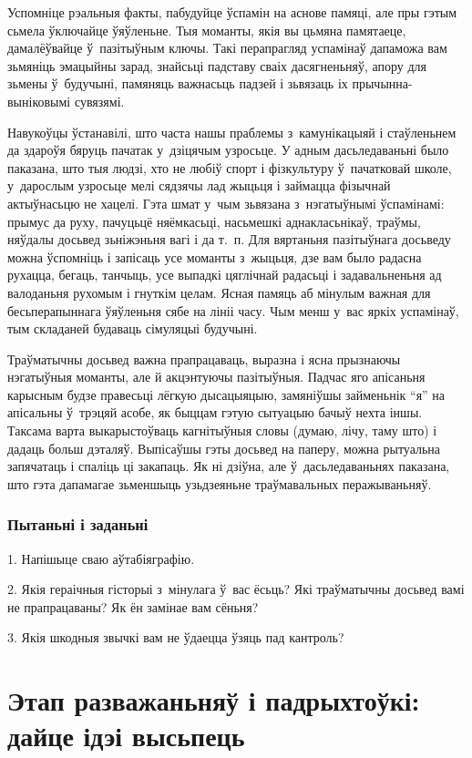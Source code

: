 Успомніце рэальныя факты, пабудуйце ўспамін на аснове памяці, але пры гэтым сьмела ўключайце ўяўленьне. Тыя моманты, якія вы цьмяна памятаеце, дамалёўвайце ў~пазітыўным ключы. Такі перапрагляд успамінаў дапаможа вам зьмяніць эмацыйны зарад, знайсьці падставу сваіх дасягненьняў, апору для зьмены ў~будучыні, памяняць важнасьць падзей і зьвязаць іх прычынна-выніковымі сувязямі.

Навукоўцы ўстанавілі, што часта нашы праблемы з~камунікацыяй і стаўленьнем да здароўя бяруць пачатак у~дзіцячым узросьце. У адным дасьледаваньні было паказана, што тыя людзі, хто не любіў спорт і фізкультуру ў~пачатковай школе, у~дарослым узросьце мелі сядзячы лад жыцьця і займацца фізычнай актыўнасьцю не хацелі. Гэта шмат у~чым зьвязана з~нэгатыўнымі ўспамінамі: прымус да руху, пачуцьцё няёмкасьці, насьмешкі аднакласьнікаў, траўмы, няўдалы досьвед зьніжэньня вагі і да т.~п. Для вяртаньня пазітыўнага досьведу можна ўспомніць і запісаць усе моманты з~жыцьця, дзе вам было радасна рухацца, бегаць, танчыць, усе выпадкі цяглічнай радасьці і задавальненьня ад валоданьня рухомым і гнуткім целам. Ясная памяць аб мінулым важная для бесьперапыннага ўяўленьня сябе на лініі часу. Чым менш у~вас яркіх успамінаў, тым складаней будаваць сімуляцыі будучыні.

Траўматычны досьвед важна прапрацаваць, выразна і ясна прызнаючы нэгатыўныя моманты, але й акцэнтуючы пазітыўныя. Падчас яго апісаньня карысным будзе правесьці лёгкую дысацыяцыю, замяніўшы займеньнік ``я'' на апісальны ў~трэцяй асобе, як быццам гэтую сытуацыю бачыў нехта іншы. Таксама варта выкарыстоўваць кагнітыўныя словы (думаю, лічу, таму што) і дадаць больш дэталяў. Выпісаўшы гэты досьвед на паперу, можна рытуальна запячатаць і спаліць ці закапаць. Як ні дзіўна, але ў~дасьледаваньнях паказана, што гэта дапамагае зьменшыць узьдзеяньне траўмавальных перажываньняў.

\subsubsection{Пытаньні і заданьні}

1. Напішыце сваю аўтабіяграфію.

2. Якія гераічныя гісторыі з~мінулага ў~вас ёсьць? Які траўматычны досьвед вамі не прапрацаваны? Як ён замінае вам сёньня?

3. Якія шкодныя звычкі вам не ўдаецца ўзяць пад кантроль?


\section{Этап разважаньняў і падрыхтоўкі: дайце ідэі высьпець}

